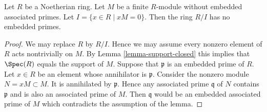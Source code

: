 \begin{lemma}
\label{lemma-no-embedded-primes-endos}
Let $R$ be a Noetherian ring.
Let $M$ be a finite $R$-module without embedded associated primes.
Let $I = \{x \in R \mid xM = 0\}$. Then the ring $R/I$ has no
embedded primes.
\end{lemma}

\begin{proof}
We may replace $R$ by $R/I$.
Hence we may assume every nonzero element
of $R$ acts nontrivially on $M$.
By Lemma \ref{lemma-support-closed} this implies that
$\Spec(R)$ equals the support of $M$.
Suppose that $\mathfrak p$ is an embedded prime of $R$.
Let $x \in R$ be an element whose annihilator is $\mathfrak p$.
Consider the nonzero module $N = xM \subset M$. It is annihilated
by $\mathfrak p$. Hence any associated prime $\mathfrak q$ of $N$
contains $\mathfrak p$ and is also an associated prime of $M$.
Then $\mathfrak q$ would be an embedded associated prime of
$M$ which contradicts the assumption of the lemma.
\end{proof}


















